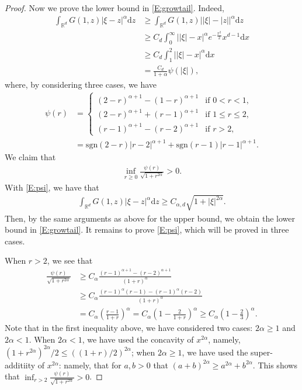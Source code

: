 \documentclass[12pt]{report}
\theoremstyle{plain}
\theoremstyle{definition}
\numberwithin{equation}{section}
\newcommand{\R}{\mathbb{R}}
\newcommand{\ud}{\ensuremath{ \mathrm{d} }}
\begin{document}
\begin{proof}
	 Now we prove the lower bound in \eqref{E:growtail}. Indeed,
	\begin{align*}
	\int_{\R^d}G\left(1,z\right) |\xi-z|^\alpha \ud z
	& \ge \int_{\R^d}G\left(1,z\right) \big| |\xi| - |z| \big|^\alpha \ud z \\
	&  \ge {C_d} \int_0^\infty \big| |\xi| - x \big|^\alpha e^{-\frac{x^2}{2}}x^{d-1}\ud x \\
	&  \ge C_d \int_1^2 \big| |\xi| - x \big|^\alpha \ud x \\
	&  = \frac{C_d}{1+\alpha} \psi\left(|\xi|\right),
	\end{align*}
	where, by considering three cases, we have
	\begin{align*}
	\psi(r)
	& =
	\begin{cases}
	(2-r)^{\alpha+1} - (1-r)^{\alpha+1} & \text{if $0<r<1$},        \\
	(2-r)^{\alpha+1} + (r-1)^{\alpha+1} & \text{if $1\le r \le 2$}, \\
	(r-1)^{\alpha+1} - (r-2)^{\alpha+1} & \text{if $r > 2$},
	\end{cases} \\
	& = \text{sgn}(2-r)|r-2|^{\alpha+1} + \text{sgn}(r-1)|r-1|^{\alpha+1}.
	\end{align*}
	We claim that
	\begin{align} \label{E:psi}
	\inf_{r\ge 0} \frac{\psi(r)}{\sqrt{1+r^{2\alpha}}}>0.
	\end{align}
	With \eqref{E:psi}, we have that
	\begin{align*}
	\int_{\R^d}G\left(1,z\right) |\xi-z|^\alpha \ud z \ge C_{\alpha, d} \sqrt{1+|\xi|^{2\alpha}}.
	\end{align*}
	Then, by the same arguments as above for the upper bound, we obtain the lower bound in \eqref{E:growtail}. It remains to prove
	\eqref{E:psi}, which will be proved in three cases.
	
	When $r>2$, we see that
	\begin{align*}
	\frac{\psi(r)}{\sqrt{1+r^{2\alpha}}}
	& \ge C_\alpha \frac{(r-1)^{\alpha+1}-(r-2)^{\alpha+1}}{(1+r)^\alpha}       \\
	& \ge C_\alpha \frac{(r-1)^{\alpha}(r-1)-(r-1)^{\alpha}(r-2)}{(1+r)^\alpha} \\
	& = C_\alpha \left(\frac{r-1}{1+r}\right)^\alpha
	= C_\alpha \left(1-\frac{2}{1+r}\right)^\alpha \ge C_\alpha \left(1-\frac{2}{3}\right)^\alpha.
	\end{align*}
	Note that in the first inequality above, we have considered two
	cases: $2\alpha \ge 1$ and $2 \alpha < 1$. When $2\alpha < 1$, we have used the concavity of
	$x^{2\alpha}$, namely, $ (1 + r^{2\alpha})^{2\alpha} / 2 \le ((1+r)/2)^{2\alpha}$; when $2\alpha
	\ge 1$, we have used the super-additiity of $x^{2\alpha}$: namely, that for $a,b>0$ that $
	(a+b)^{2\alpha}\ge a^{2\alpha} + b^{2\alpha}$. This shows that $\inf_{r>2}
	\frac{\psi(r)}{\sqrt{1+r^{2\alpha}}} >0$.
	

\end{proof}
\end{document}
